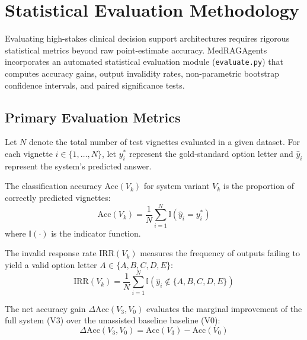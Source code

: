 \section{Statistical Evaluation Methodology}
\label{sec:statistical_methodology}

Evaluating high-stakes clinical decision support architectures requires rigorous statistical metrics beyond raw point-estimate accuracy. MedRAGAgents incorporates an automated statistical evaluation module (\texttt{evaluate.py}) that computes accuracy gains, output invalidity rates, non-parametric bootstrap confidence intervals, and paired significance tests.

\subsection{Primary Evaluation Metrics}

Let $N$ denote the total number of test vignettes evaluated in a given dataset. For each vignette $i \in \{1, \dots, N\}$, let $y_i^*$ represent the gold-standard option letter and $\hat{y}_i$ represent the system's predicted answer.

\begin{definition}
The classification accuracy $\text{Acc}(V_k)$ for system variant $V_k$ is the proportion of correctly predicted vignettes:
\begin{equation}
    \text{Acc}(V_k) = \frac{1}{N} \sum_{i=1}^{N} \mathbb{I}(\hat{y}_i = y_i^*)
\end{equation}
where $\mathbb{I}(\cdot)$ is the indicator function.
\end{definition}

\begin{definition}
The invalid response rate $\text{IRR}(V_k)$ measures the frequency of outputs failing to yield a valid option letter $A \in \{A, B, C, D, E\}$:
\begin{equation}
    \text{IRR}(V_k) = \frac{1}{N} \sum_{i=1}^{N} \mathbb{I}(\hat{y}_i \notin \{A, B, C, D, E\})
\end{equation}
\end{definition}

\begin{definition}
The net accuracy gain $\Delta \text{Acc}(V_3, V_0)$ evaluates the marginal improvement of the full system (V3) over the unassisted baseline baseline (V0):
\begin{equation}
    \Delta \text{Acc}(V_3, V_0) = \text{Acc}(V_3) - \text{Acc}(V_0)
\end{equation}
\end{definition}

